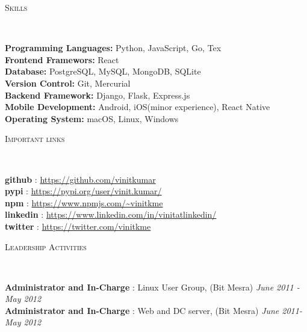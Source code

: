 \documentclass[9pt]{article}
\newenvironment{changemargin}[2]{%
  \begin{list}{}{%
    \setlength{\topsep}{0pt}%
    \setlength{\leftmargin}{#1}%
    \setlength{\rightmargin}{#2}%
    \setlength{\listparindent}{\parindent}%
    \setlength{\itemindent}{\parindent}%
    \setlength{\parsep}{\parskip}%
  }%
  \item[]}{\end{list}
}
\newcommand{\lineover}{
    \begin{changemargin}{-0.05in}{-0.05in}
        \vspace*{-8pt}
        \hrulefill \\
        \vspace*{-2pt}
    \end{changemargin}
}
\newcommand{\header}[1]{
    \begin{changemargin}{-0.5in}{-0.5in}
        \scshape{#1}\\
    \lineover
    \end{changemargin}
}
\newenvironment{body} {
    \vspace*{-16pt}
    \begin{changemargin}{-0.25in}{-0.5in}
  }
    {\end{changemargin}
}
\begin{document}
\begin{body}
\header{Skills}

\begin{body}
    \vspace{14pt}
    \textbf{Programming Languages:}{} Python, JavaScript, Go, Tex\\
    \textbf{Frontend Framewors:}{} React\\
    \textbf{Database:}{} PostgreSQL, MySQL, MongoDB, SQLite\\
    \textbf{Version Control:}{} Git, Mercurial\\
    \textbf{Backend Framework:}{} Django, Flask, Express.js\\
    \textbf{Mobile Development:}{} Android, iOS(minor experience), React Native\\
    \textbf{Operating System:}{} macOS, Linux, Windows\\
\end{body}

\smallskip


\header{Important links}

\begin{body}
    \vspace{14pt}
    \textbf{github} :  \url{https://github.com/vinitkumar}\\
    \smallskip
    \textbf{pypi} :  \url{https://pypi.org/user/vinit.kumar/}\\
    \smallskip
    \textbf{npm} : \url{https://www.npmjs.com/~vinitkme}\\
    \smallskip
    \textbf{linkedin} :  \url{https://www.linkedin.com/in/vinitatlinkedin/}\\
    \smallskip
    \textbf{twitter} :  \url{https://twitter.com/vinitkme}\\
\end{body}

\smallskip

\header{Leadership Activities}

\begin{body}
    \vspace{14pt}
    \textbf{Administrator and In-Charge} : Linux User Group, (Bit Mesra) \hfill {} \emph{June 2011 - May 2012}\\
    \smallskip
    \textbf{Administrator and In-Charge} : Web and DC server, (Bit Mesra) \hfill{} \emph{June 2011- May 2012}\\
\end{body}


\end{body}
\end{document}
